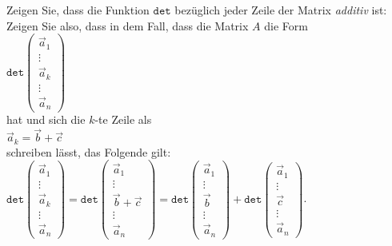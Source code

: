 \exercise 
Zeigen Sie, dass die Funktion $\mathtt{det}$ bez\"uglich jeder Zeile der Matrix \emph{additiv} ist: Zeigen Sie
also, dass in dem Fall, dass die Matrix $A$ die Form
\\[0.2cm]
\hspace*{1.3cm}
$\mathtt{det}\left(
  \begin{array}{ll}
    \vec{a}_1 \\ \vdots \\ \vec{a}_k \\ \vdots \\ \vec{a}_n
  \end{array} \right)
$
\\[0.2cm]
hat und sich die $k$-te Zeile als 
\\[0.2cm]
\hspace*{1.3cm}
$\vec{a}_k = \vec{b} + \vec{c}$
\\[0.2cm]
schreiben l\"asst, das Folgende gilt:
  \\[0.2cm]
  \hspace*{1.3cm}
$\mathtt{det}\left(
  \begin{array}{c}
    \vec{a}_1 \\ \vdots \\ \vec{a}_k \\ \vdots \\ \vec{a}_n
  \end{array} 
  \right) =
\mathtt{det}\left(
  \begin{array}{c}
    \vec{a}_1 \\ \vdots \\ \vec{b} + \vec{c}\\ \vdots \\ \vec{a}_n
  \end{array} 
  \right)
 = \mathtt{det}\left(
  \begin{array}{c}
    \vec{a}_1 \\ \vdots \\ \vec{b} \\ \vdots \\ \vec{a}_n
  \end{array}  \right)
+
   \mathtt{det}\left(
  \begin{array}{c}
    \vec{a}_1 \\ \vdots \\ \vec{c} \\ \vdots \\ \vec{a}_n
  \end{array} 
  \right)
$.
\eoxs

